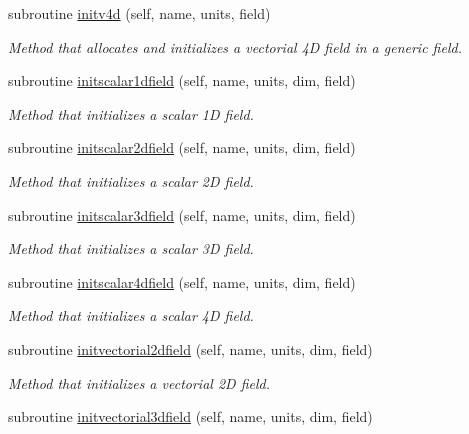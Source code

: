 \begin{DoxyCompactItemize}
subroutine \mbox{\hyperlink{namespacefield__types__mod_a6a387f83b9c3e63a795e3bccfff5573b}{initv4d}} (self, name, units, field)
\begin{DoxyCompactList}\small\item\em Method that allocates and initializes a vectorial 4D field in a generic field. \end{DoxyCompactList}\item 
subroutine \mbox{\hyperlink{namespacefield__types__mod_a40667ebd7c9f62482c267e794a14eff4}{initscalar1dfield}} (self, name, units, dim, field)
\begin{DoxyCompactList}\small\item\em Method that initializes a scalar 1D field. \end{DoxyCompactList}\item 
subroutine \mbox{\hyperlink{namespacefield__types__mod_af0bade94ad526899be6a55a81a407231}{initscalar2dfield}} (self, name, units, dim, field)
\begin{DoxyCompactList}\small\item\em Method that initializes a scalar 2D field. \end{DoxyCompactList}\item 
subroutine \mbox{\hyperlink{namespacefield__types__mod_af27a754aea73132de47e0a1b7168ca2e}{initscalar3dfield}} (self, name, units, dim, field)
\begin{DoxyCompactList}\small\item\em Method that initializes a scalar 3D field. \end{DoxyCompactList}\item 
subroutine \mbox{\hyperlink{namespacefield__types__mod_a52e2310f95a85bf65d4a85427814a5ad}{initscalar4dfield}} (self, name, units, dim, field)
\begin{DoxyCompactList}\small\item\em Method that initializes a scalar 4D field. \end{DoxyCompactList}\item 
subroutine \mbox{\hyperlink{namespacefield__types__mod_a31c78f82114b5bf8014f7aac09030c32}{initvectorial2dfield}} (self, name, units, dim, field)
\begin{DoxyCompactList}\small\item\em Method that initializes a vectorial 2D field. \end{DoxyCompactList}\item 
subroutine \mbox{\hyperlink{namespacefield__types__mod_a712c0d9941013a8f8c28e684a7c7f4c7}{initvectorial3dfield}} (self, name, units, dim, field)

\end{DoxyCompactItemize}
